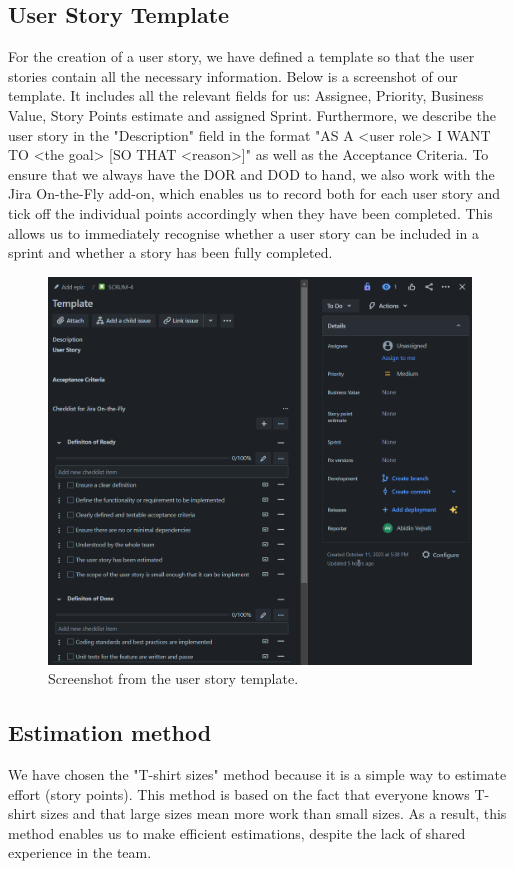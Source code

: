 \subsection{User Story Template}
For the creation of a user story, we have defined a template so that the user stories contain all the necessary information. Below is a screenshot of our template. It includes all the relevant fields for us: Assignee, Priority, Business Value, Story Points estimate and assigned Sprint. Furthermore, we describe the user story in the "Description" field in the format "AS A <user role> I WANT TO <the goal> [SO THAT <reason>]" as well as the Acceptance Criteria.
To ensure that we always have the DOR and DOD to hand, we also work with the Jira On-the-Fly add-on, which enables us to record both for each user story and tick off the individual points accordingly when they have been completed. This allows us to immediately recognise whether a user story can be included in a sprint and whether a story has been fully completed.
\begin{figure}[h!]
    \centering
    \includegraphics[width=1\textwidth]{pictures/user_story_vorlage}
    \caption{Screenshot from the user story template.}
    \label{fig:user_story_template}
\end{figure}
\clearpage

\subsection{Estimation method}
We have chosen the "T-shirt sizes" method because it is a simple way to estimate effort (story points). This method is based on the fact that everyone knows T-shirt sizes and that large sizes mean more work than small sizes. As a result, this method enables us to make efficient estimations, despite the lack of shared experience in the team.

